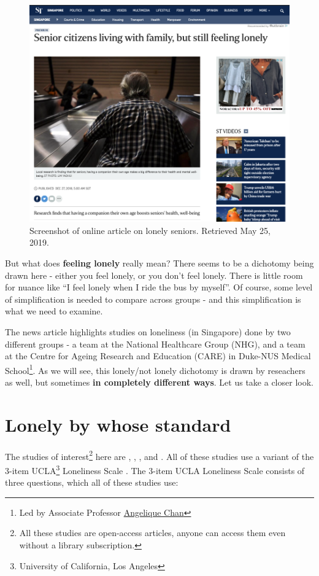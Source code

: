\documentclass[
  openany]{book}
\begin{document}
\begin{figure}

{\centering \includegraphics[width=0.8\linewidth]{images/loneliness/livingarr} 

}

\caption{Screenshot of online article on lonely seniors. Retrieved May 25, 2019.}\label{fig:st-lonely}
\end{figure}

But what does \textbf{feeling lonely} really mean? There seems to be a dichotomy being drawn here - either you feel lonely, or you don't feel lonely. There is little room for nuance like ``I feel lonely when I ride the bus by myself''. Of course, some level of simplification is needed to compare across groups - and this simplification is what we need to examine.

The news article highlights studies on loneliness (in Singapore) done by two different groups - a team at the National Healthcare Group (NHG), and a team at the Centre for Ageing Research and Education (CARE) in Duke-NUS Medical School\footnote{Led by Associate Professor \href{https://www.duke-nus.edu.sg/hssr/our-team/faculty/faculty-staff-details/Detail/13200}{Angelique Chan}}. As we will see, this lonely/not lonely dichotomy is drawn by reseachers as well, but sometimes \textbf{in completely different ways}. Let us take a closer look.

\hypertarget{lonely-by-whose-standard}{%
\section{Lonely by whose standard}\label{lonely-by-whose-standard}}

The studies of interest\footnote{All these studies are open-access articles, anyone can access them even without a library subscription.} here are \citet{wee_loneliness_2019}, \citet{ge_social_2017}, \citet{lim_association_2017}, and \citet{chan_loneliness_2015}. All of these studies use a variant of the 3-item UCLA\footnote{University of California, Los Angeles} Loneliness Scale \citep{hughes_short_2004}. The 3-item UCLA Loneliness Scale consists of three questions, which all of these studies use:
\end{document}
